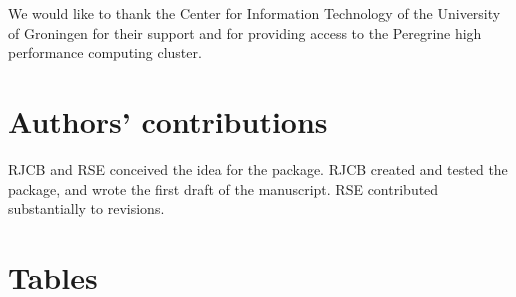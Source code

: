 \documentclass{article}
\begin{document}
We would like to thank the Center for Information Technology of the University of Groningen for their support
and for providing access to the Peregrine high performance computing cluster.

\section{Authors' contributions}

RJCB and RSE conceived the idea for the package. RJCB created and tested the package, and wrote the first draft of the manuscript. RSE contributed substantially to revisions.




\section{Tables}
\end{document}
